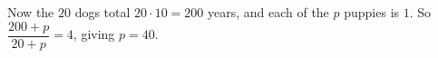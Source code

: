 Now the $20$ dogs total $20\cdot10=200$ years, and each of the $p$ puppies is $1$. So $\dfrac{200+p}{20+p}=4$, giving $p=\boxed{40}$.
